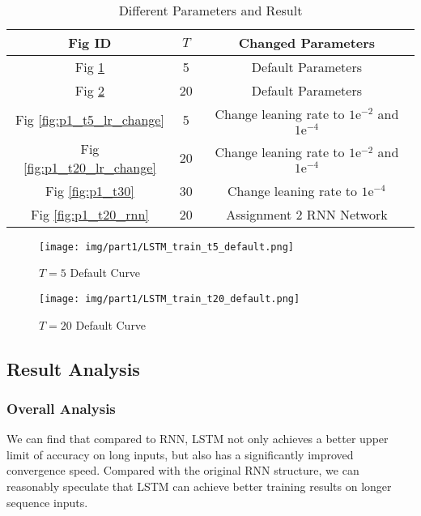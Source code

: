 \begin{table}[!h]
  \centering\caption{Different Parameters and Result}
  \label{tab:p1_res_para}
  \begin{tabular}{|c|c|c|}
    \hline
    \textbf{Fig ID} & $T$ & \textbf{Changed Parameters} \\
    \hline
    Fig \ref{fig:p1_t5_default} & 5 & Default Parameters \\ \hline
    Fig \ref{fig:p1_t20_default} & 20 & Default Parameters \\ \hline
    Fig \ref{fig:p1_t5_lr_change} & 5 & Change leaning rate to $1\mathrm{e}^{-2}$ and $1\mathrm{e}^{-4}$ \\ \hline
    Fig \ref{fig:p1_t20_lr_change} & 20 & Change leaning rate to $1\mathrm{e}^{-2}$ and $1\mathrm{e}^{-4}$ \\ \hline
    Fig \ref{fig:p1_t30} & 30 & Change leaning rate to $1\mathrm{e}^{-4}$ \\ \hline
    Fig \ref{fig:p1_t20_rnn} & 20 & Assignment 2 RNN Network \\ \hline
  \end{tabular}
\end{table}

\begin{figure}[!htbp]
  \centering
  \texttt{[image: img/part1/LSTM\_train\_t5\_default.png]}
  \caption{$T = 5$ Default Curve}
  \label{fig:p1_t5_default}
\end{figure}

\begin{figure}[!htbp]
  \centering
  \texttt{[image: img/part1/LSTM\_train\_t20\_default.png]}
  \caption{$T = 20$ Default Curve}
  \label{fig:p1_t20_default}
\end{figure}

\subsection{Result Analysis}

\subsubsection{Overall Analysis}

We can find that compared to RNN, LSTM not only achieves a better upper limit of accuracy on long inputs, but also has a significantly improved convergence speed.
Compared with the original RNN structure, we can reasonably speculate that LSTM can achieve better training results on longer sequence inputs.

